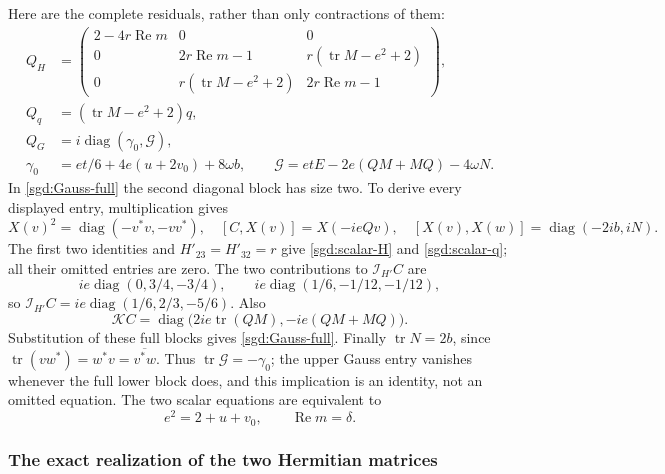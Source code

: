 Here are the complete residuals, rather than only contractions of them:
\begin{align}
 Q_H&=\begin{pmatrix}
 2-4r\operatorname{Re}m&0&0\\
 0&2r\operatorname{Re}m-1&r(\operatorname{tr} M-e^2+2)\\
 0&r(\operatorname{tr} M-e^2+2)&2r\operatorname{Re}m-1
 \end{pmatrix},\label{sgd:scalar-H}\\
 Q_q&=(\operatorname{tr} M-e^2+2)q,\label{sgd:scalar-q}\\
 Q_G&=i\operatorname{diag}(\gamma_0,\mathcal G),\label{sgd:Gauss-full}\\
 \gamma_0&=et/6+4e(u+2v_0)+8\omega b,\qquad
 \mathcal G=etE-2e(QM+MQ)-4\omega N.\label{sgd:Gauss-entries}
\end{align}
In \eqref{sgd:Gauss-full} the second diagonal block has size two.
To derive every displayed entry, multiplication gives
\[
 X(v)^2=\operatorname{diag}(-v^*v,-vv^*),\quad
 [C,X(v)]=X(-ieQv),\quad
 [X(v),X(w)]=\operatorname{diag}(-2ib,iN).
\]
The first two identities and $H'_{23}=H'_{32}=r$ give
\eqref{sgd:scalar-H} and \eqref{sgd:scalar-q}; all their omitted entries
are zero. The two contributions to $\mathcal I_{H'}C$ are
\[
 ie\operatorname{diag}(0,3/4,-3/4),\qquad
 ie\operatorname{diag}(1/6,-1/12,-1/12),
\]
so $\mathcal I_{H'}C=ie\operatorname{diag}(1/6,2/3,-5/6)$. Also
\[
 \mathcal KC=\operatorname{diag}\bigl(2ie\operatorname{tr}(QM),-ie(QM+MQ)\bigr).
\]
Substitution of these full blocks gives \eqref{sgd:Gauss-full}.
Finally $\operatorname{tr} N=2b$, since $\operatorname{tr}(vw^*)=w^*v=\overline{v^*w}$.
Thus $\operatorname{tr}\mathcal G=-\gamma_0$; the upper Gauss entry vanishes
whenever the full lower block does, and this implication is an identity,
not an omitted equation. The two scalar equations are equivalent to
\begin{equation}
 e^2=2+u+v_0,\qquad \operatorname{Re}m=\delta.
 \label{sgd:scalar-conditions}
\end{equation}

\subsubsection{The exact realization of the two Hermitian matrices}

